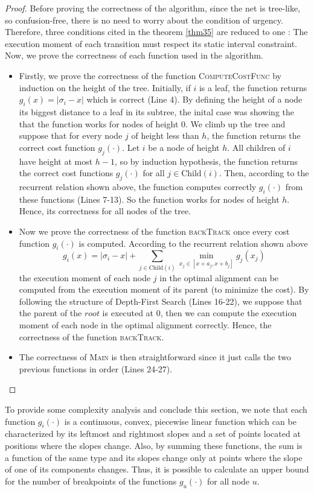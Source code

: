 \documentclass[conference]{IEEEtran}
\begin{document}
\begin{proof}
	Before proving the correctness of the algorithm, since the net is tree-like, so confusion-free, there is no need to worry about the condition of urgency. Therefore,
	three conditions cited in the theorem \ref{thm35} are reduced to one : The execution moment of each transition must respect its static interval constraint.	Now, we prove the correctness of each function used in the algorithm.
	\begin{itemize}
		\item Firstly, we prove the correctness of the function \textsc{ComputeCostFunc} by induction on the height of the tree.
		Initially, if $i$ is a leaf, the function returns $g_{i}(x) = |\sigma_{i} - x|$ which is correct (Line 4).
		By defining the height of a node its biggest distance to a leaf in its subtree, the inital case was showing the that the function works for nodes of height 0.
		We climb up the tree and suppose that for every node $j$ of height less than $h$, the function returns the correct cost function $g_{j}(\cdot)$.
		Let $i$ be a node of height $h$. All children of $i$ have height at most $h-1$, so by induction hypothesis, the function returns the correct cost functions $g_{j}(\cdot)$ for all $j \in \text{Child}(i)$.
		Then, according to the recurrent relation shown above, the function computes correctly $g_{i}(\cdot)$ from these functions (Lines 7-13). So the function works for nodes of height $h$. Hence, its correctness for all nodes of the tree.
		\item Now we prove the correctness of the function \textsc{backTrack} once every cost function $g_{i}(\cdot)$ is computed.
		According to the recurrent relation shown above \[g_{i}(x) = |\sigma_{i}-x| + \sum_{j \in \text{Child}(i)}\min_{x_{j}\in[x+a_{j},x+b_{j}]}g_{j}(x_{j})\]
		the execution moment of each node $j$ in the optimal alignment can be computed from the execution moment of its parent (to minimize the cost).
		By following the structure of Depth-First Search (Lines 16-22), we suppose that the parent of the $root$ is executed at 0, then we can compute the execution moment of each node in the optimal alignment correctly. Hence, the correctness of the function \textsc{backTrack}.
		\item The correctness of \textsc{Main} is then straightforward since it just calls the two previous functions in order (Lines 24-27).
	\end{itemize}
\end{proof}

To provide some complexity analysis and conclude this section, we note that each function $g_i(\cdot)$ is a continuous, convex, piecewise linear function
which can be characterized by its leftmost and rightmost slopes and a set of points located at positions where the slopes change. Also, by summing these functions, the sum is a function of the same type and its slopes change only at points where the slope of one of its components changes. 
Thus, it is possible to calculate an upper bound for the number of breakpoints of the functions $g_{u}(\cdot)$ for all node $u$.
\end{document}
